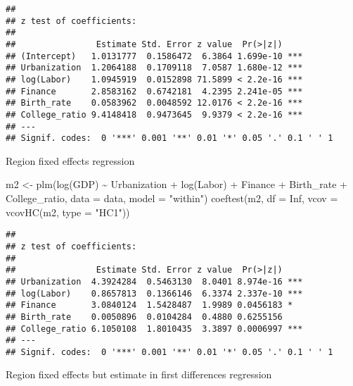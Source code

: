 \documentclass[
]{article}
\newenvironment{Shaded}{\begin{snugshade}}{\end{snugshade}}
\newcommand{\AttributeTok}[1]{\textcolor[rgb]{0.77,0.63,0.00}{#1}}
\newcommand{\ConstantTok}[1]{\textcolor[rgb]{0.00,0.00,0.00}{#1}}
\newcommand{\FunctionTok}[1]{\textcolor[rgb]{0.00,0.00,0.00}{#1}}
\newcommand{\NormalTok}[1]{#1}
\newcommand{\OtherTok}[1]{\textcolor[rgb]{0.56,0.35,0.01}{#1}}
\newcommand{\SpecialCharTok}[1]{\textcolor[rgb]{0.00,0.00,0.00}{#1}}
\newcommand{\StringTok}[1]{\textcolor[rgb]{0.31,0.60,0.02}{#1}}
\begin{document}
\begin{verbatim}
## 
## z test of coefficients:
## 
##                Estimate Std. Error z value  Pr(>|z|)    
## (Intercept)   1.0131777  0.1586472  6.3864 1.699e-10 ***
## Urbanization  1.2064188  0.1709118  7.0587 1.680e-12 ***
## log(Labor)    1.0945919  0.0152898 71.5899 < 2.2e-16 ***
## Finance       2.8583162  0.6742181  4.2395 2.241e-05 ***
## Birth_rate    0.0583962  0.0048592 12.0176 < 2.2e-16 ***
## College_ratio 9.4148418  0.9473645  9.9379 < 2.2e-16 ***
## ---
## Signif. codes:  0 '***' 0.001 '**' 0.01 '*' 0.05 '.' 0.1 ' ' 1
\end{verbatim}

\newpage

Region fixed effects regression

\begin{Shaded}
\begin{Highlighting}[]
\NormalTok{m2 }\OtherTok{\textless{}{-}} \FunctionTok{plm}\NormalTok{(}\FunctionTok{log}\NormalTok{(GDP) }\SpecialCharTok{\textasciitilde{}}\NormalTok{ Urbanization }\SpecialCharTok{+} \FunctionTok{log}\NormalTok{(Labor) }\SpecialCharTok{+}\NormalTok{ Finance }\SpecialCharTok{+}\NormalTok{ Birth\_rate }\SpecialCharTok{+}\NormalTok{ College\_ratio, }
          \AttributeTok{data =}\NormalTok{ data, }\AttributeTok{model =} \StringTok{"within"}\NormalTok{)}
\FunctionTok{coeftest}\NormalTok{(m2, }\AttributeTok{df =} \ConstantTok{Inf}\NormalTok{, }\AttributeTok{vcov =} \FunctionTok{vcovHC}\NormalTok{(m2, }\AttributeTok{type =} \StringTok{"HC1"}\NormalTok{))}
\end{Highlighting}
\end{Shaded}

\begin{verbatim}
## 
## z test of coefficients:
## 
##                Estimate Std. Error z value  Pr(>|z|)    
## Urbanization  4.3924284  0.5463130  8.0401 8.974e-16 ***
## log(Labor)    0.8657813  0.1366146  6.3374 2.337e-10 ***
## Finance       3.0840124  1.5428487  1.9989 0.0456183 *  
## Birth_rate    0.0050896  0.0104284  0.4880 0.6255156    
## College_ratio 6.1050108  1.8010435  3.3897 0.0006997 ***
## ---
## Signif. codes:  0 '***' 0.001 '**' 0.01 '*' 0.05 '.' 0.1 ' ' 1
\end{verbatim}

\newpage

Region fixed effects but estimate in first differences regression
\end{document}
